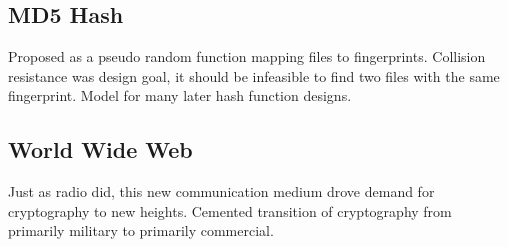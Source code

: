 \documentclass[psamsfonts]{amsart}
\begin{document}
\subsection{MD5 Hash}

Proposed as a pseudo random function mapping files to fingerprints. Collision resistance was design goal, it should be infeasible to find two files with the same fingerprint. Model for many later hash function designs.

\subsection{World Wide Web}

Just as radio did, this new communication medium drove demand for cryptography to new heights. Cemented transition of cryptography from primarily military to primarily commercial.
\end{document}
